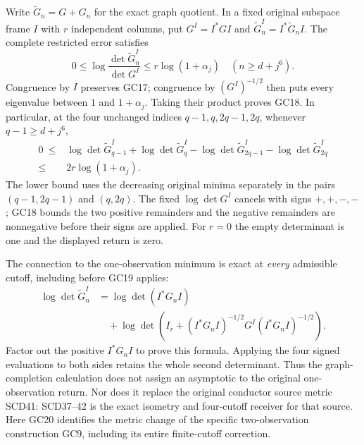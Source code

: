 Write $\widetilde G_n=G+G_n$ for the exact graph quotient. In a
fixed original subspace frame $I$ with $r$ independent columns,
put $G^I=I^*GI$ and $\widetilde G_n^I=I^*\widetilde G_nI$.
The complete restricted error satisfies
\[
 0\le \log\frac{\det\widetilde G_n^I}{\det G^I}
       \le r\log(1+\alpha_j)\quad(n\ge d+j^6).
 \tag{GC18}\label{gc:restriction-error}
\]
Congruence by $I$ preserves GC17; congruence by $(G^I)^{-1/2}$
then puts every eigenvalue between $1$ and $1+\alpha_j$.
Taking their product proves GC18. In particular, at the four
unchanged indices $q-1,q,2q-1,2q$, whenever $q-1\ge d+j^6$,
\[
\begin{split}
0\ \le{}&\log\det\widetilde G_{q-1}^I
 +\log\det\widetilde G_q^I
 -\log\det\widetilde G_{2q-1}^I
 -\log\det\widetilde G_{2q}^I\\
 \le{}&2r\log(1+\alpha_j).
\end{split}
 \tag{GC19}\label{gc:four-cutoff}
\]
The lower bound uses the decreasing original minima separately
in the pairs $(q-1,2q-1)$ and $(q,2q)$. The fixed $\log\det G^I$
cancels with signs $+,+,-,-$; GC18 bounds the two positive
remainders and the negative remainders are nonnegative before
their signs are applied. For $r=0$ the empty determinant is one
and the displayed return is zero.

The connection to the one-observation minimum is exact at
\emph{every} admissible cutoff, including before GC19 applies:
\[
\begin{split}
\log\det\widetilde G_n^I
 &=\log\det(I^*G_nI)\\
 &\quad+\log\det\left(
 I_r+(I^*G_nI)^{-1/2}G^I(I^*G_nI)^{-1/2}\right).
\end{split}
 \tag{GC20}\label{gc:native-correction}
\]
Factor out the positive $I^*G_nI$ to prove this formula. Applying
the four signed evaluations to both sides retains the whole
second determinant. Thus the graph-completion calculation does
not assign an asymptotic to the original one-observation return.
Nor does it replace the original conductor source metric
SCD41: SCD37--42 is the exact isometry and four-cutoff receiver
for that source. Here GC20 identifies the metric change of the
specific two-observation construction GC9, including its entire
finite-cutoff correction.

